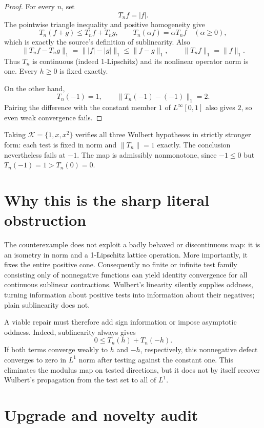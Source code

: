 \documentclass[11pt]{article}
\begin{document}
\begin{proof}
For every $n$, set
\[
                 T_nf=|f|.
\]
The pointwise triangle inequality and positive homogeneity give
\[
 T_n(f+g)\le T_nf+T_ng,
 \qquad T_n(\alpha f)=\alpha T_nf\quad(\alpha\ge0),
\]
which is exactly the source's definition of sublinearity.  Also
\[
 \|T_nf-T_ng\|_1
 =\big\||f|-|g|\big\|_1\le\|f-g\|_1,
 \qquad \|T_nf\|_1=\|f\|_1.
\]
Thus $T_n$ is continuous (indeed 1-Lipschitz) and its nonlinear operator norm
is one.  Every $h\ge0$ is fixed exactly.

On the other hand,
\[
 T_n(-1)=1,
 \qquad \|T_n(-1)-(-1)\|_1=2.
\]
Pairing the difference with the constant member $1$ of $L^\infty[0,1]$ also
gives $2$, so even weak convergence fails.
\end{proof}

Taking $\mathcal K=\{1,x,x^2\}$ verifies all three Wulbert hypotheses in
strictly stronger form: each test is fixed in norm and $\|T_n\|=1$ exactly.
The conclusion nevertheless fails at $-1$.  The map is admissibly
nonmonotone, since $-1\le0$ but $T_n(-1)=1>T_n(0)=0$.

\section*{Why this is the sharp literal obstruction}

The counterexample does not exploit a badly behaved or discontinuous map: it
is an isometry in norm and a 1-Lipschitz lattice operation.  More importantly,
it fixes the entire positive cone.  Consequently no finite or infinite test
family consisting only of nonnegative functions can yield identity
convergence for all continuous sublinear contractions.  Wulbert's linearity
silently supplies oddness, turning information about positive tests into
information about their negatives; plain sublinearity does not.

A viable repair must therefore add sign information or impose asymptotic
oddness.  Indeed, sublinearity always gives
\[
 0\le T_n(h)+T_n(-h).
\]
If both terms converge weakly to $h$ and $-h$, respectively, this nonnegative
defect converges to zero in $L^1$ norm after testing against the constant one.
This eliminates the modulus map on tested directions, but it does not by
itself recover Wulbert's propagation from the test set to all of $L^1$.

\section*{Upgrade and novelty audit}
\end{document}
